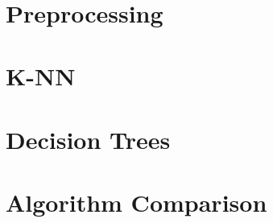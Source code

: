 \documentclass[11pt,a4paper, twoside]{article}
\begin{document}
\newpage



\newpage~\newpage

\section{Preprocessing}







\newpage
\section{K-NN}
\label{sec:KNN}







\newpage
\section{Decision Trees}\label{sec:tree}








\newpage
\section{Algorithm Comparison}






\newpage


% 
% 
% 
% 
% 
% 
% 
% 
% 
% 
% 
% 
% 
\end{document}

